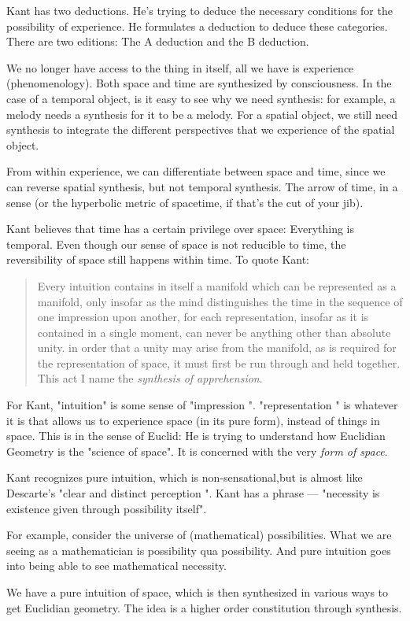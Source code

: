 \documentclass[11pt]{book}
\begin{document}
Kant has two deductions. He's trying to deduce the necessary conditions for
the possibility of experience. He formulates a deduction to deduce these categories.
There are two editions: The A deduction and the B deduction.

We no longer have access to the thing in itself, all we have is
experience (phenomenology). Both space and time are synthesized by consciousness.
In the case of a temporal object, is it easy to see why 
we need synthesis: for example, a melody needs a synthesis for it to be a melody.
For a spatial object, we still need synthesis to integrate the different
perspectives that we experience of the spatial object. 

From within experience, we can differentiate between space and time, since we can
reverse spatial synthesis, but not temporal synthesis. The arrow of time, in a
sense (or the hyperbolic metric of spacetime, if that's the cut of your jib).

Kant believes that time has a certain privilege over space: Everything is temporal.
Even though our sense of space is not reducible to time, the reversibility of space
still happens within time. To quote Kant:

\begin{quote}
	Every intuition contains in itself a manifold which can be represented
	as a manifold, only insofar as the mind distinguishes the time in the
	sequence of one impression upon another, for each representation, insofar
	as it is contained in a single moment, can never be anything other than
	absolute unity. in order that a unity may arise from the manifold, as is required
	for the representation of space, it must first be run through and
	held together. This act I name the \emph{synthesis of apprehension}.
\end{quote}

For Kant, "intuition" is some sense of "impression ". "representation "
is whatever it is that 
allows us to experience space (in its pure form), instead of things in space. This
is in the sense of Euclid: He is trying to understand how Euclidian Geometry
is the "science of space". It is concerned with the very \emph{form of space}.

Kant recognizes pure intuition, which is non-sensational,but is almost like 
Descarte's "clear and distinct perception ". Kant has a phrase --- 
"necessity is existence given through possibility itself".

For example, consider the universe of (mathematical) possibilities. What
we are seeing as a mathematician is possibility qua possibility. And pure 
intuition goes into being able to see mathematical necessity.

We have a pure intuition of space, which is
then synthesized in various ways to get Euclidian geometry.
The idea is a higher order constitution through synthesis. 
\end{document}

